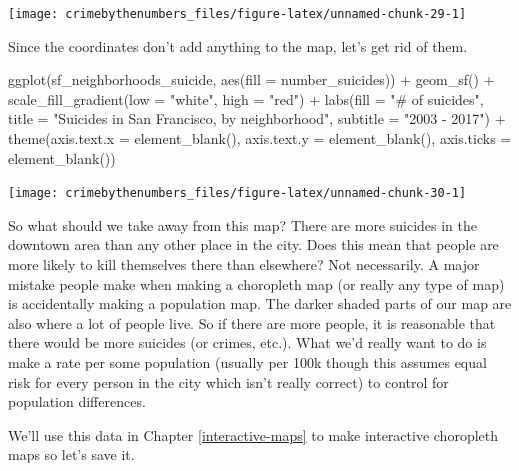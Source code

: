 \documentclass[
]{krantz}
\makeatletter
\newenvironment{Shaded}{\begin{snugshade}}{\end{snugshade}}
\newcommand{\AttributeTok}[1]{\textcolor[rgb]{0.61,0.61,0.61}{#1}}
\newcommand{\FunctionTok}[1]{\textcolor[rgb]{0,0,0}{#1}}
\newcommand{\NormalTok}[1]{#1}
\newcommand{\SpecialCharTok}[1]{\textcolor[rgb]{0,0,0}{#1}}
\newcommand{\StringTok}[1]{\textcolor[rgb]{0.5,0.5,0.5}{#1}}
\newenvironment{kframe}{%
\medskip{}
\setlength{\fboxsep}{.8em}
 \def\at@end@of@kframe{}%
 \ifinner\ifhmode%
  \def\at@end@of@kframe{\end{minipage}}%
  \begin{minipage}{\columnwidth}%
 \fi\fi%
 \def\FrameCommand##1{\hskip\@totalleftmargin \hskip-\fboxsep
 \colorbox{shadecolor}{##1}\hskip-\fboxsep
     \hskip-\linewidth \hskip-\@totalleftmargin \hskip\columnwidth}%
 \MakeFramed {\advance\hsize-\width
   \@totalleftmargin\z@ \linewidth\hsize
   \@setminipage}}%
 {\par\unskip\endMakeFramed%
 \at@end@of@kframe}
\renewenvironment{Shaded}{\begin{kframe}}{\end{kframe}}
\makeatother
\begin{document}
\begin{center}\texttt{[image: crimebythenumbers\_files/figure-latex/unnamed-chunk-29-1]} \end{center}

Since the coordinates don't add anything to the map, let's get rid of them.

\begin{Shaded}
\begin{Highlighting}[]
\FunctionTok{ggplot}\NormalTok{(sf\_neighborhoods\_suicide, }\FunctionTok{aes}\NormalTok{(}\AttributeTok{fill =}\NormalTok{ number\_suicides)) }\SpecialCharTok{+}
  \FunctionTok{geom\_sf}\NormalTok{() }\SpecialCharTok{+}
  \FunctionTok{scale\_fill\_gradient}\NormalTok{(}\AttributeTok{low =} \StringTok{"white"}\NormalTok{, }\AttributeTok{high =} \StringTok{"red"}\NormalTok{) }\SpecialCharTok{+}
  \FunctionTok{labs}\NormalTok{(}\AttributeTok{fill =} \StringTok{"\# of suicides"}\NormalTok{,}
       \AttributeTok{title =} \StringTok{"Suicides in San Francisco, by neighborhood"}\NormalTok{,}
       \AttributeTok{subtitle =} \StringTok{"2003 {-} 2017"}\NormalTok{) }\SpecialCharTok{+}
  \FunctionTok{theme}\NormalTok{(}\AttributeTok{axis.text.x =} \FunctionTok{element\_blank}\NormalTok{(),}
        \AttributeTok{axis.text.y =} \FunctionTok{element\_blank}\NormalTok{(),}
        \AttributeTok{axis.ticks =} \FunctionTok{element\_blank}\NormalTok{())}
\end{Highlighting}
\end{Shaded}

\begin{center}\texttt{[image: crimebythenumbers\_files/figure-latex/unnamed-chunk-30-1]} \end{center}

So what should we take away from this map? There are more suicides in the downtown area than any other place in the city. Does this mean that people are more likely to kill themselves there than elsewhere? Not necessarily. A major mistake people make when making a choropleth map (or really any type of map) is accidentally making a population map. The darker shaded parts of our map are also where a lot of people live. So if there are more people, it is reasonable that there would be more suicides (or crimes, etc.). What we'd really want to do is make a rate per some population (usually per 100k though this assumes equal risk for every person in the city which isn't really correct) to control for population differences.

We'll use this data in Chapter \ref{interactive-maps} to make interactive choropleth maps so let's save it.
\end{document}
